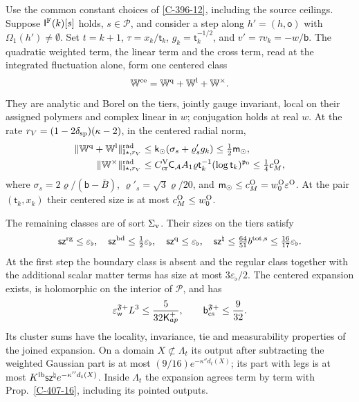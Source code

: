 \documentclass[11pt,letterpaper,reqno]{amsart}
\makeatletter
\theoremstyle{definition}
\newcommand{\ms@minorstart}{%
  \pushQED{\qed}\renewcommand{\qedsymbol}{$\blacksquare$}}
\newenvironment{lemma}[1][]{\ms@minorstart\ms@lemma[#1]}
  {\popQED\endms@lemma}
\theoremstyle{remark}
\makeatother
\begin{document}
\begin{lemma}[The centered frame at a source]\label{C-407-38}
Use the common constant choices of \cref{C-396-12}, including
the source ceilings. Suppose
$\mathsf I^{\rm F}(k)[s]$ holds, $s\in\mathcal P$, and consider a
step along $h'=(h,\mathsf o)$ with $\Omega_1(h')\ne\emptyset$.
Set $t=k+1$, $\tau=x_k/\mathsf t_k$, $g_k=\mathsf t_k^{-1/2}$,
and $v'=\tau v_k=-w/\mathsf b$. The quadratic weighted term,
the linear term and the cross term, read at the integrated
fluctuation alone, form one centered class
\[
 \mathbb W^{\rm ce}=\mathbb W^{\rm q}
                         +\mathbb W^{\rm l}+\mathbb W^\times.
\]
They are analytic and Borel on the tiers, jointly gauge invariant,
local on their assigned polymers and complex linear in $w$;
conjugation holds at real $w$. At the rate
$r_V=(1-2\delta_{\rm sp})(\kappa-2)$, in the centered radial norm,
\[
\begin{split}
 \|\mathbb W^{\rm q}+\mathbb W^{\rm l}\|^{\rm rad}_{{\rm I}\star,r_V}
 &\le\mathsf k_\odot(\sigma_s+\varrho'_sg_k)
                         \le\tfrac12\mathsf m_\odot,\\
 \|\mathbb W^\times\|^{\rm rad}_{{\rm I}\star,r_V}
 &\le C_{\rm cr}^{\rm V}\mathsf C_{\mathcal A}A_1\varrho
           \mathsf t_k^{-1}(\log\mathsf t_k)^{\mathfrak p_0}
                         \le\tfrac14c_M^{\rm O},
\end{split}
\]
where $\sigma_s=2\varrho/(\mathsf b-\bar B)$,
$\varrho'_s=\sqrt3\varrho/20$, and
$\mathsf m_\odot\le c_M^{\rm O}=w_0^{\rm O}\varepsilon^{\rm O}$.
At the pair $(\mathsf t_k,x_k)$ their centered size is at most
$c_M^{\rm O}\le w_0^{\rm O}$.

The remaining classes are of sort $\Sigma_{\rm v}$. Their sizes
on the tiers satisfy
\[
 \mathsf{sz}^{\rm rg}\le\varepsilon_\flat,\quad
 \mathsf{sz}^{\rm bd}\le\tfrac12\varepsilon_\flat,\quad
 \mathsf{sz}^{\rm q}\le\varepsilon_\flat,\quad
 \mathsf{sz}^\natural\le\tfrac{64}{51}b^{\rm tot,s}
                         \le\tfrac{16}{17}\varepsilon_\flat.
\]
At the first step the boundary class is absent and the regular
class together with the additional scalar matter terms has size
at most $3\varepsilon_\flat/2$. The centered expansion exists,
is holomorphic on the interior of $\mathcal P$, and has
\[
 \varepsilon_{\mathsf w}^{\mathfrak F+}L^3
       \le\frac5{32\mathsf K_{
       ap}^+},\qquad
 \mathsf b_{\rm cs}^{\mathfrak F+}\le\frac9{32}.
\]
Its cluster sums have the locality, invariance, tie and
measurability properties of the joined expansion. On a domain
$X\not\subset\Lambda_t$ its output after subtracting the
weighted Gaussian part is at most
$(9/16)e^{-\kappa''d_t(X)}$; its part with legs is at most
$K^{\rm lb}\mathsf{sz}^\natural e^{-\kappa''d_t(X)}$.
Inside $\Lambda_t$ the expansion agrees term by term with
Prop.~\ref{C-407-16}, including its pointed outputs.
\end{lemma}
\end{document}
